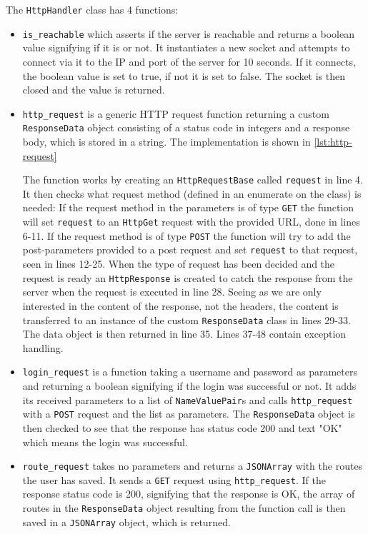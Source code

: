 The \texttt{HttpHandler} class has 4 functions: 
\begin{itemize}
\item  \texttt{is\_reachable} which asserts if the server is reachable and returns a boolean value signifying if it is or not. It instantiates a new socket and attempts to connect via it to the IP and port of the server for 10 seconds. If it connects, the boolean value is set to true, if not it is set to false. The socket is then closed and the value is returned.

\item \texttt{http\_request} is a generic \ac{HTTP} request function returning a custom \texttt{ResponseData} object consisting of a status code in integers and a response body, which is stored in a string. The implementation is shown in \autoref{lst:http-request}

The function works by creating an \texttt{HttpRequestBase} called \texttt{request} in line 4. It then checks what request method (defined in an enumerate on the class) is needed: If the request method in the parameters is of type \texttt{GET} the function will set \texttt{request} to an \texttt{HttpGet} request with the provided URL, done in lines 6-11. If the request method is of type \texttt{POST} the function will try to add the post-parameters provided to a post request and set \texttt{request} to that request, seen in lines 12-25. When the type of request has been decided and the request is ready an \texttt{HttpResponse} is created to catch the response from the server when the request is executed in line 28. Seeing as we are only interested in the content of the response, not the headers, the content is transferred to an instance of the custom \texttt{ResponseData} class in lines 29-33. The data object is then returned in line 35. Lines 37-48 contain exception handling.
 
\item \texttt{login\_request} is a function taking a username and password as parameters and returning a boolean signifying if the login was successful or not. It adds its received parameters to a list of \texttt{NameValuePair}s and calls \texttt{http\_request} with a \texttt{POST} request and the list as parameters. The \texttt{ResponseData} object is then checked to see that the response has status code 200 and text "OK" which means the login was successful.

\item \texttt{route\_request} takes no parameters and returns a \texttt{JSONArray} with the routes the user has saved. It sends a \texttt{GET} request using \texttt{http\_request}. If the response status code is 200, signifying that the response is OK, the array of routes in the \texttt{ResponseData} object resulting from the function call is then saved in a \texttt{JSONArray} object, which is returned. 
\end{itemize}

